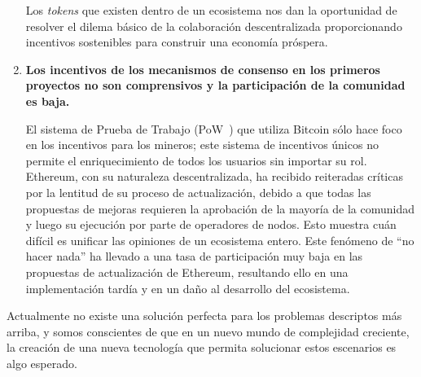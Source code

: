 \begin{enumerate}
	Los \textit{tokens} que existen dentro de un ecosistema \blockchain nos dan la oportunidad de resolver el dilema básico de la colaboración descentralizada proporcionando incentivos sostenibles para construir una economía próspera.

	\item

	\textbf{Los incentivos de los mecanismos de consenso en los primeros proyectos \blockchain no son comprensivos y la participación de la comunidad es baja.}

	El sistema de Prueba de Trabajo (PoW~\cite{pow}) que utiliza Bitcoin sólo hace foco en los incentivos para los mineros; este sistema de incentivos únicos no permite el enriquecimiento de todos los usuarios sin importar su rol. Ethereum, con su naturaleza descentralizada, ha recibido reiteradas críticas por la lentitud de su proceso de actualización, debido a que todas las propuestas de mejoras requieren la aprobación de la mayoría de la comunidad y luego su ejecución por parte de operadores de nodos. Esto muestra cuán difícil es unificar las opiniones de un ecosistema entero. Este fenómeno de “no hacer nada” ha llevado a una tasa de participación muy baja en las propuestas de actualización de Ethereum, resultando ello en una implementación tardía y en un daño al desarrollo del ecosistema.

\end{enumerate}

Actualmente no existe una solución perfecta para los problemas descriptos más arriba, y somos conscientes de que en un nuevo mundo de complejidad creciente, la creación de una nueva tecnología que permita solucionar estos escenarios es algo esperado.